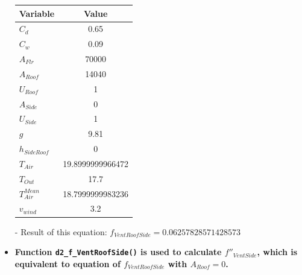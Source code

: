 \documentclass[a4paper]{article}
\numberwithin{equation}{section}
\begin{document}
\begin{itemize}
        \begin{table}[H]
          \centering
          \begin{tabular}{@{}lS[table-format=5.13]@{}}
            \toprule
            \textbf{Variable}  & \textbf{Value}   \\
            \midrule
            \( C_d \)            & 0.65             \\
            \( C_w \)            & 0.09             \\
            \( A_{Flr} \)        & 70000            \\
            \( A_{Roof} \)       & 14040            \\
            \( U_{Roof} \)       & 1                \\
            \( A_{Side} \)       & 0                \\
            \( U_{Side} \)       & 1                \\
            \( g \)              & 9.81             \\
            \( h_{SideRoof} \)   & 0                \\
            \( T_{Air} \)        & 19.8999999966472 \\
            \( T_{Out} \)        & 17.7             \\
            \( T_{Air}^{Mean} \) & 18.7999999983236 \\
            \( v_{wind} \)       & 3.2              \\
            \bottomrule
          \end{tabular}
        \end{table}

  \item[-] Result of this equation: \( f_{VentRoofSide} = 0.06257828571428573 \)

  \item \textbf{Function \texttt{d2\_f\_VentRoofSide()} is used to calculate \( f''_{VentSide} \), which is equivalent to equation of \( f_{VentRoofSide} \) with \( A_{Roof} = 0 \).}


\end{itemize}
\end{document}

